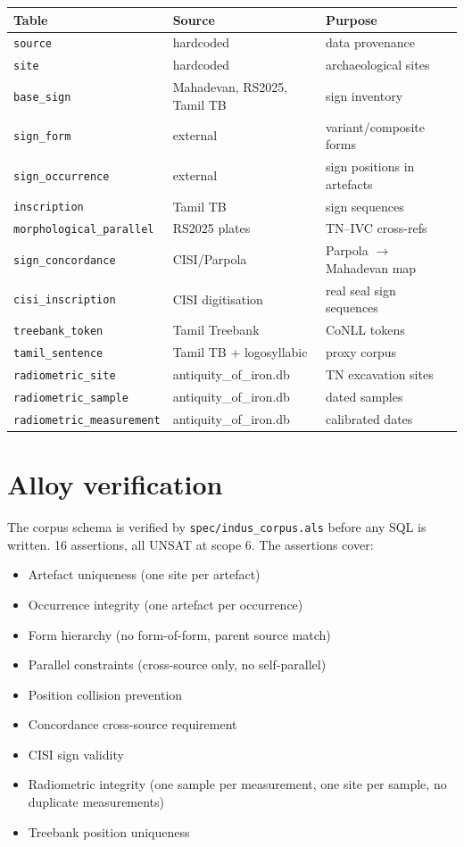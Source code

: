 \documentclass[11pt]{article}
\begin{document}
\begin{center}
\small
\begin{tabular}{@{}lll@{}}
\toprule
\textbf{Table} & \textbf{Source} & \textbf{Purpose} \\
\midrule
\texttt{source} & hardcoded & data provenance \\
\texttt{site} & hardcoded & archaeological sites \\
\texttt{base\_sign} & Mahadevan, RS2025, Tamil TB & sign inventory \\
\texttt{sign\_form} & external & variant/composite forms \\
\texttt{sign\_occurrence} & external & sign positions in artefacts \\
\texttt{inscription} & Tamil TB & sign sequences \\
\texttt{morphological\_parallel} & RS2025 plates & TN--IVC cross-refs \\
\texttt{sign\_concordance} & CISI/Parpola & Parpola $\to$ Mahadevan map \\
\texttt{cisi\_inscription} & CISI digitisation & real seal sign sequences \\
\texttt{treebank\_token} & Tamil Treebank & CoNLL tokens \\
\texttt{tamil\_sentence} & Tamil TB + logosyllabic & proxy corpus \\
\texttt{radiometric\_site} & antiquity\_of\_iron.db & TN excavation sites \\
\texttt{radiometric\_sample} & antiquity\_of\_iron.db & dated samples \\
\texttt{radiometric\_measurement} & antiquity\_of\_iron.db & calibrated dates \\
\bottomrule
\end{tabular}
\end{center}

\section{Alloy verification}

The corpus schema is verified by \texttt{spec/indus\_corpus.als}
before any SQL is written. 16 assertions, all UNSAT at scope 6.
The assertions cover:

\begin{itemize}[nosep]
\item Artefact uniqueness (one site per artefact)
\item Occurrence integrity (one artefact per occurrence)
\item Form hierarchy (no form-of-form, parent source match)
\item Parallel constraints (cross-source only, no self-parallel)
\item Position collision prevention
\item Concordance cross-source requirement
\item CISI sign validity
\item Radiometric integrity (one sample per measurement,
  one site per sample, no duplicate measurements)
\item Treebank position uniqueness
\end{itemize}
\end{document}
